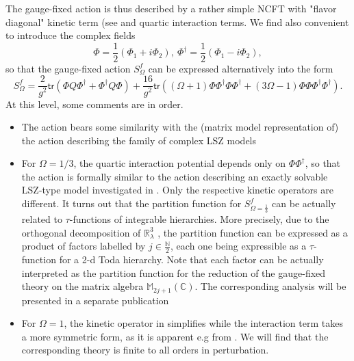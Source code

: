 \documentclass[10pt]{book}
\newcommand{\tr}{\mathsf{tr}}
\theoremstyle{break}
\begin{document}
%
The gauge-fixed action %
is thus described by a rather simple NCFT with "flavor diagonal" kinetic term (see %
and quartic interaction terms. We find also convenient to introduce the complex fields%
%
\begin{equation}
\Phi=\frac{1}{2}(\Phi_1+i\Phi_2),\ \Phi^\dag=\frac{1}{2}(\Phi_1-i\Phi_2),
\end{equation}
%
so that the gauge-fixed action $S^f_\Omega$ can be expressed alternatively into the form%
%
\begin{equation}
S^f_\Omega = \frac{2}{g^2} \tr\left( \Phi Q \Phi^\dag + \Phi^\dag Q\Phi \right) + \frac{16}{g^2} \tr\left( (\Omega+1) \Phi\Phi^\dag\Phi\Phi^\dag + (3\Omega-1) \Phi\Phi\Phi^\dag\Phi^\dag \right) .
\end{equation}
%
At this level, some comments are in order.
\begin{itemize}
%
\item The action %
bears some similarity with the (matrix model representation of) the action describing the family of complex LSZ models %

\item For $\Omega=1/3$, the quartic interaction potential depends only on $\Phi\Phi^\dag$, so that the action is formally similar to the action describing an exactly solvable LSZ-type model investigated in %
. Only the respective kinetic operators are different. It turns out that the partition function for $S^f_{\Omega=\frac{1}{3}}$ %
can be actually related to $\tau$-functions of integrable hierarchies. More precisely, due to the orthogonal decomposition of $\mathbb{R}^3_\lambda$ 
, the partition function can be expressed as a product of factors labelled by $j\in\frac{\mathbb{N}}{2}$, each one being expressible as a $\tau$-function for a 2-d Toda hierarchy. Note that each factor can be actually interpreted as the partition function for the reduction of the gauge-fixed theory %
on the matrix algebra $\mathbb{M}_{2j+1}(\mathbb{C})$. The corresponding analysis will be presented in a separate publication %

\item For $\Omega=1$, the kinetic operator in %
simplifies while the interaction term takes a more symmetric form, as it is apparent e.g from %
. We will find that the corresponding theory is finite to all orders in perturbation.%
%
\end{itemize}
\end{document}
